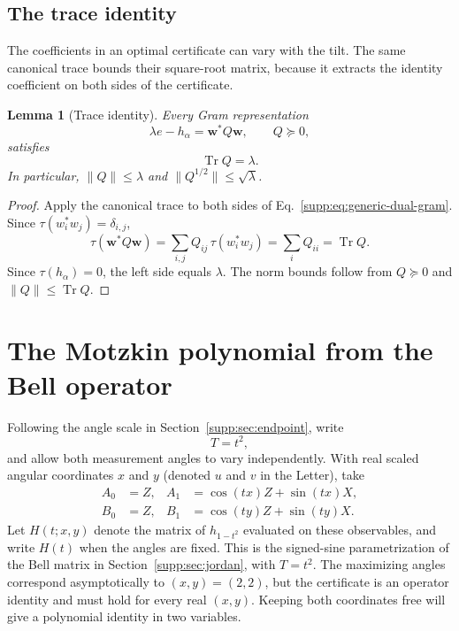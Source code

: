 \documentclass[aps,prl,onecolumn,10pt,superscriptaddress,nofootinbib,longbibliography]{revtex4-2}
\newtheorem{lemma}[theorem]{Lemma}
\theoremstyle{remark}
\newcommand{\Tr}{\operatorname{Tr}}
\begin{document}
\subsection{The trace identity}

The coefficients in an optimal certificate can vary with the tilt. The same canonical trace bounds their square-root matrix, because it extracts the identity coefficient on both sides of the certificate.

\begin{lemma}[Trace identity]
\label{supp:lem:trace-identity}
Every Gram representation
\begin{equation}
\lambda e-h_\alpha=\bm w^*Q\bm w,
\qquad Q\succeq0,
\label{supp:eq:generic-dual-gram}
\end{equation}
satisfies
\begin{equation}
\Tr Q=\lambda.
\label{supp:eq:trace-Q}
\end{equation}
In particular, $\|Q\|\leq\lambda$ and $\|Q^{1/2}\|\leq\sqrt\lambda$.
\end{lemma}

\begin{proof}
Apply the canonical trace to both sides of Eq.~\eqref{supp:eq:generic-dual-gram}. Since $\tau(w_i^*w_j)=\delta_{i,j}$,
\begin{equation}
\tau(\bm w^*Q\bm w)
=\sum_{i,j}Q_{ij}\,\tau(w_i^*w_j)
=\sum_iQ_{ii}
=\Tr Q.
\label{supp:eq:trace-gram-calculation}
\end{equation}
Since $\tau(h_\alpha)=0$, the left side equals $\lambda$. The norm bounds follow from $Q\succeq0$ and $\|Q\|\leq\Tr Q$.
\end{proof}

\section{The Motzkin polynomial from the Bell operator}
\label{supp:sec:motzkin}

Following the angle scale in Section~\ref{supp:sec:endpoint}, write
\begin{equation}
T=t^2,
\label{supp:eq:T-t}
\end{equation}
and allow both measurement angles to vary independently. With real scaled angular coordinates $x$ and $y$ (denoted $u$ and $v$ in the Letter), take
\begin{align}
A_0&=Z,&A_1&=\cos(tx)Z+\sin(tx)X,\nonumber\\
B_0&=Z,&B_1&=\cos(ty)Z+\sin(ty)X.
\label{supp:eq:two-parameter-observables}
\end{align}
Let $H(t;x,y)$ denote the matrix of $h_{1-t^2}$ evaluated on these observables, and write $H(t)$ when the angles are fixed. This is the signed-sine parametrization of the Bell matrix in Section~\ref{supp:sec:jordan}, with $T=t^2$. The maximizing angles correspond asymptotically to $(x,y)=(2,2)$, but the certificate is an operator identity and must hold for every real $(x,y)$. Keeping both coordinates free will give a polynomial identity in two variables.
\end{document}

